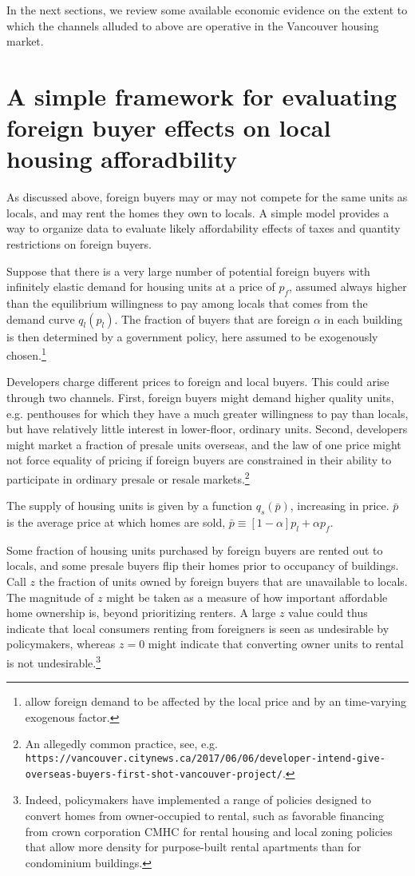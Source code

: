 \documentclass[12pt]{article}
\begin{document}
In the next sections, we review some available economic evidence on the extent to which 
the channels alluded to above are operative in the Vancouver housing market.

\section{A simple framework for evaluating foreign buyer effects on local housing afforadbility}

As discussed above, foreign buyers may or may not compete for the same units as
locals, and may rent the homes they own to locals. A simple model provides a
way to organize data to evaluate likely affordability effects of taxes and
quantity restrictions on foreign buyers.

Suppose that there is a very large number of potential foreign buyers with
infinitely elastic demand for housing units at a price of $p_{f}$, assumed
always higher than the equilibrium willingness to pay among locals that comes
from the demand curve $q_{l}\left(p_{l}\right)$. The fraction of buyers that
are foreign $\alpha$ in each building is then determined by a government
policy, here assumed to be exogenously
chosen.\footnote{\textcite{FavilukisVanNieuwerburgh} allow foreign demand to be
affected by the local price and by an time-varying exogenous factor.}

Developers charge different prices to foreign and local buyers. This could
arise through two channels. First, foreign buyers might demand higher quality
units, e.g. penthouses for which they have a much greater willingness to pay
than locals, but have relatively little interest in lower-floor, ordinary
units. Second, developers might market a fraction of presale units 
overseas, and the law of one price might not force equality of pricing if
foreign buyers are constrained in their ability to participate in ordinary
presale or resale markets.\footnote{An allegedly common practice, see, e.g.
\texttt{https://vancouver.citynews.ca/2017/06/06/developer-intend-give-overseas-buyers-first-shot-vancouver-project/}.}

The supply of housing units is given by a function $q_{s}\left(\bar{p}\right)$,
increasing in price. $\bar{p}$ is the average price at which homes are sold,
$\bar{p} \equiv \left[1-\alpha\right]p_{l} + \alpha p_{f}$.

Some fraction of housing units purchased by foreign buyers are rented out to
locals, and some presale buyers flip their homes prior to occupancy of
buildings. Call $z$ the fraction of units owned by foreign buyers that are
unavailable to locals. The magnitude of $z$ might be taken as a measure of how
important affordable home ownership is, beyond prioritizing renters. A large
$z$ value could thus indicate that local consumers renting from foreigners is
seen as undesirable by policymakers, whereas $z=0$ might indicate that
converting owner units to rental is not undesirable.\footnote{Indeed,
policymakers have implemented a range of policies designed to convert homes
from owner-occupied to rental, such as favorable financing from crown
corporation CMHC for rental housing and local zoning policies that allow more
density for purpose-built rental apartments than for condominium buildings.}
\end{document}
